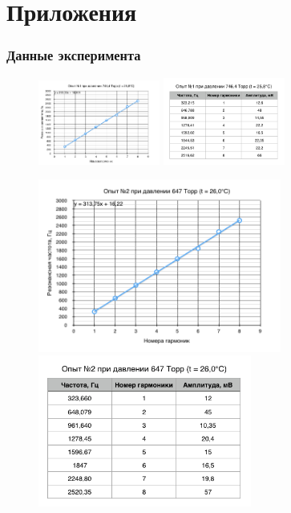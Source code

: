 \documentclass[a4paper,12pt]{article}
\begin{document}
\newpage
\clearpage
\part{Приложения}
\setcounter{section}{0}
\section{Данные эксперимента}

\setcounter{figure}{0}
\begin{figure}[h]
	\begin{multicols}{2}
		\hfill
		\includegraphics[width=40mm]{gr1.png}
		\hfill
		\label{gr1}
		\hfill
		\includegraphics[width=40mm]{t1.png}
		\hfill
		\label{t1}
	\end{multicols}
\end{figure}
\begin{figure}[h]
	\begin{multicols}{2}
		\hfill
		\includegraphics[width=80mm]{gr2.png}
		\hfill
		\label{gr2}
		\hfill
		\includegraphics[width=70mm]{t2.png}
		\hfill
		\label{t2}
	\end{multicols}
\end{figure}
\end{document}
